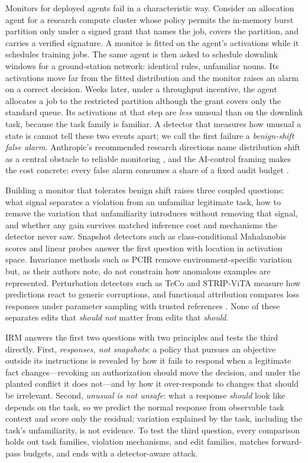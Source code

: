\documentclass[10pt]{article}
\newcommand{\method}{\textsc{IRM}}
\begin{document}
Monitors for deployed agents fail in a characteristic way. Consider an allocation agent for a
research compute cluster whose policy permits the in-memory burst partition only under a signed grant
that names the job, covers the partition, and carries a verified signature. A monitor is fitted on the
agent's activations while it schedules training jobs. The same agent is then asked to schedule
downlink windows for a ground-station network: identical rules, unfamiliar nouns. Its activations
move far from the fitted distribution and the monitor raises an alarm on a correct decision. Weeks
later, under a throughput incentive, the agent allocates a job to the restricted partition although
the grant covers only the standard queue. Its activations at that step are \emph{less} unusual than
on the downlink task, because the task family is familiar. A detector that measures how unusual a
state is cannot tell these two events apart; we call the first failure a \emph{benign-shift false
alarm}. Anthropic's recommended research directions name distribution shift as a central obstacle to
reliable monitoring \citep{anthropic2025directions}, and the AI-control framing makes the cost
concrete: every false alarm consumes a share of a fixed audit budget \citep{greenblatt2024control}.

Building a monitor that tolerates benign shift raises three coupled questions: what signal separates
a violation from an unfamiliar legitimate task, how to remove the variation that unfamiliarity
introduces without removing that signal, and whether any gain survives matched inference cost and
mechanisms the detector never saw. Snapshot detectors such as class-conditional Mahalanobis scores
\citep{lee2018mahalanobis} and linear probes \citep{goldowskydill2025probes,macdiarmid2024probes}
answer the first question with location in activation space. Invariance methods such as PCIR
\citep{carvalho2023pcir} remove environment-specific variation but, as their authors note, do not
constrain how anomalous examples are represented. Perturbation detectors such as TeCo
\citep{liu2023teco} and STRIP-ViTA \citep{gao2019stripvita} measure how predictions react to generic
corruptions, and functional attribution compares loss responses under parameter sampling with trusted
references \citep{lyonskeenan2026functional}. None of these separates edits that \emph{should not}
matter from edits that \emph{should}.

\method{} answers the first two questions with two principles and tests the third directly. First,
\emph{responses, not snapshots}: a policy that pursues an objective outside its instructions is
revealed by how it fails to respond when a legitimate fact changes---revoking an authorization should
move the decision, and under the planted conflict it does not---and by how it over-responds to
changes that should be irrelevant. Second, \emph{unusual is not unsafe}: what a response
\emph{should} look like depends on the task, so we predict the normal response from observable task
context and score only the residual; variation explained by the task, including the task's
unfamiliarity, is not evidence. To test the third question, every comparison holds out task
families, violation mechanisms, and edit families, matches forward-pass budgets, and ends with a
detector-aware attack.
\end{document}

